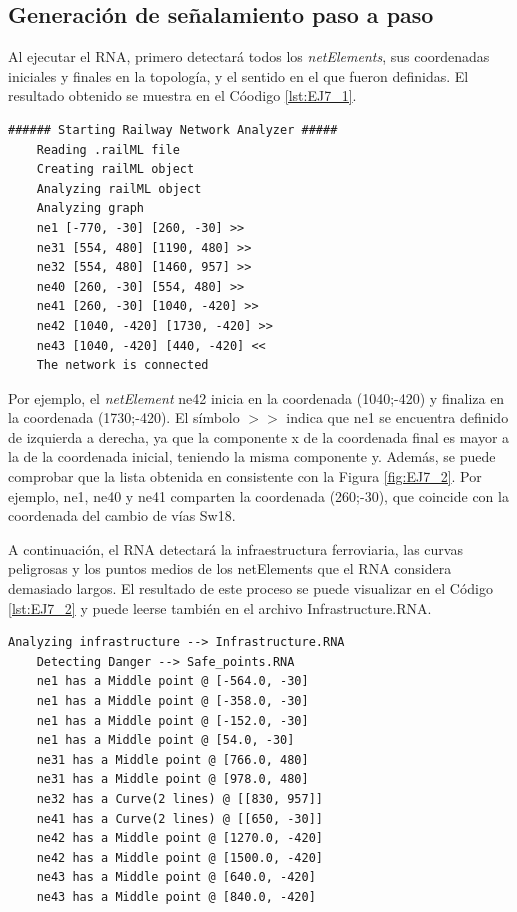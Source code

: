 \subsection{Generación de señalamiento paso a paso}

	Al ejecutar el RNA, primero detectará todos los \textit{netElements}, sus coordenadas iniciales y finales en la topología, y el sentido en el que fueron definidas. El resultado obtenido se muestra en el Cóodigo \ref{lst:EJ7_1}.
	
	\begin{lstlisting}[language = {}, caption = Detección de \textit{netElements} por parte del RNA , label = {lst:EJ7_1}]
	###### Starting Railway Network Analyzer #####
	Reading .railML file
	Creating railML object
	Analyzing railML object
	Analyzing graph
	ne1 [-770, -30] [260, -30] >>
	ne31 [554, 480] [1190, 480] >>
	ne32 [554, 480] [1460, 957] >>
	ne40 [260, -30] [554, 480] >>
	ne41 [260, -30] [1040, -420] >>
	ne42 [1040, -420] [1730, -420] >>
	ne43 [1040, -420] [440, -420] <<
	The network is connected
	\end{lstlisting}
	
	Por ejemplo, el \textit{netElement} ne42 inicia en la coordenada (1040;-420) y finaliza en la coordenada (1730;-420). El símbolo $>>$ indica que ne1 se encuentra definido de izquierda a derecha, ya que la componente x de la coordenada final es mayor a la de la coordenada inicial, teniendo la misma componente y. Además, se puede comprobar que la lista obtenida en consistente con la Figura \ref{fig:EJ7_2}. Por ejemplo, ne1, ne40 y ne41 comparten la coordenada (260;-30), que coincide con la coordenada del cambio de vías Sw18.
	
	A continuación, el RNA detectará la infraestructura ferroviaria, las curvas peligrosas y los puntos medios de los netElements que el RNA considera demasiado largos. El resultado de este proceso se puede visualizar en el Código \ref{lst:EJ7_2} y puede leerse también en el archivo Infrastructure.RNA.
	
	\begin{lstlisting}[language = {}, caption = Detección de puntos críticos por parte del RNA , label = {lst:EJ7_2}]
	Analyzing infrastructure --> Infrastructure.RNA
	Detecting Danger --> Safe_points.RNA
	ne1 has a Middle point @ [-564.0, -30]
	ne1 has a Middle point @ [-358.0, -30]
	ne1 has a Middle point @ [-152.0, -30]
	ne1 has a Middle point @ [54.0, -30]
	ne31 has a Middle point @ [766.0, 480]
	ne31 has a Middle point @ [978.0, 480]
	ne32 has a Curve(2 lines) @ [[830, 957]]
	ne41 has a Curve(2 lines) @ [[650, -30]]
	ne42 has a Middle point @ [1270.0, -420]
	ne42 has a Middle point @ [1500.0, -420]
	ne43 has a Middle point @ [640.0, -420]
	ne43 has a Middle point @ [840.0, -420]
	\end{lstlisting}
	
